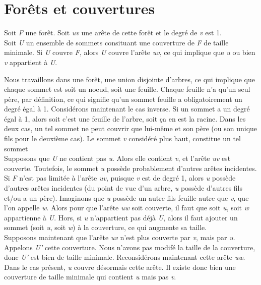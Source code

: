
\section{For\^ets et couvertures}

Soit \textit{F} une for\^et. Soit \textit{uv} une ar\^ete de cette for\^et et le degr\'e de \textit{v} est 1.\\

Soit \textit{U} un ensemble de sommets consituant une couverture de \textit{F} de taille minimale. Si \textit{U}
couvre \textit{F}, alors \textit{U} couvre l'ar\^ete \textit{uv}, ce qui implique que \textit{u} ou bien \textit{v}
appartient \`a \textit{U}.

Nous travaillons dans une for\^et, une union disjointe d'arbres, ce qui implique que chaque sommet est soit un noeud,
soit une feuille. Chaque feuille n'a qu'un seul p\`ere, par d\'efinition, ce qui signifie qu'un sommet feuille a
obligatoirement un degr\'e \'egal \`a 1. Consid\'erons maintenant le cas inverse. Si un sommet a un degr\'e \'egal \`a
1, alors soit c'est une feuille de l'arbre, soit \c{c}a en est la racine. Dans les deux cas, un tel sommet ne peut
couvrir que lui-m\^eme et son p\`ere (ou son unique fils pour le deuxi\`eme cas). Le sommet \textit{v} consid\'er\'e
plus haut, constitue un tel sommet\\

Supposons que \textit{U} ne contient pas \textit{u}. Alors elle contient \textit{v}, et l'ar\^ete \textit{uv} est
couverte. Toutefois, le sommet \textit{u} poss\`ede probablement d'autres ar\^etes incidentes. Si \textit{F} n'est pas
limit\'ee \`a l'ar\^ete \textit{uv}, puisque \textit{v} est de degr\'e 1, alors \textit{u} poss\`ede d'autres ar\^etes
incidentes (du point de vue d'un arbre, \textit{u} poss\`ede d'autres fils et/ou a un p\`ere). Imaginons que \textit{u}
poss\`ede un autre fils feuille autre que \textit{v}, que l'on appelle \textit{w}. Alors pour que l'ar\^ete \textit{uw}
soit couverte, il faut que soit \textit{u}, soit \textit{w} appartienne \`a \textit{U}. Hors, si \textit{u} n'appartient
pas d\'ej\`a \textit{U}, alors il faut ajouter un sommet (soit \textit{u}, soit \textit{w}) \`a la couverture, ce qui
augmente sa taille.\\

Supposons maintenant que l'ar\^ete \textit{uv} n'est plus couverte par \textit{v}, mais par \textit{u}. Appelons \textit{U'}
cette couverture. Nous n'avons pas modif\'e la taille de la couverture, donc \textit{U'} est bien de taille minimale.
Reconsid\'erons maintenant cette ar\^ete \textit{uw}. Dans le cas pr\'esent, \textit{u} couvre d\'esormais cette ar\^ete.
Il existe donc bien une couverture de taille minimale qui contient \textit{u} mais pas \textit{v}.


